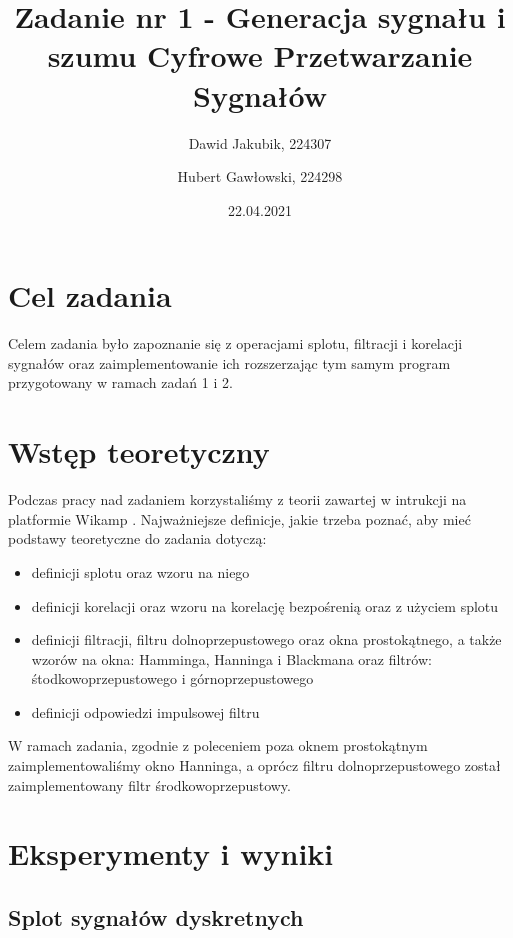 \documentclass[12pt]{article}
\title{{\bf Zadanie nr 1 - Generacja sygnału i szumu}\linebreak
Cyfrowe Przetwarzanie Sygnałów}
\author{Dawid Jakubik, 224307 \and Hubert Gawłowski, 224298}
\date{22.04.2021}
\begin{document}
\clearpage\maketitle
\thispagestyle{empty}
\newpage
\setcounter{page}{1}
\section{Cel zadania}

Celem zadania było zapoznanie się z operacjami splotu, filtracji i korelacji sygnałów oraz zaimplementowanie ich rozszerzając tym samym program przygotowany w ramach zadań 1 i 2.

\section{Wstęp teoretyczny}
Podczas pracy nad zadaniem korzystaliśmy z teorii zawartej w intrukcji na platformie Wikamp \cite{instrukcja}. Najważniejsze definicje, jakie trzeba poznać, aby mieć podstawy teoretyczne do zadania dotyczą:
\begin{itemize}
    \item definicji splotu oraz wzoru na niego
    \item definicji korelacji oraz wzoru na korelację bezpośrenią oraz z użyciem splotu
    \item definicji filtracji, filtru dolnoprzepustowego oraz okna prostokątnego, a także wzorów na okna: Hamminga, Hanninga i Blackmana oraz filtrów: śtodkowoprzepustowego i górnoprzepustowego
    \item definicji odpowiedzi impulsowej filtru
\end{itemize}
W ramach zadania, zgodnie z poleceniem poza oknem prostokątnym zaimplementowaliśmy okno Hanninga, a oprócz filtru dolnoprzepustowego został zaimplementowany filtr środkowoprzepustowy.

\section{Eksperymenty i wyniki}


\subsection{Splot sygnałów dyskretnych}
\end{document}
